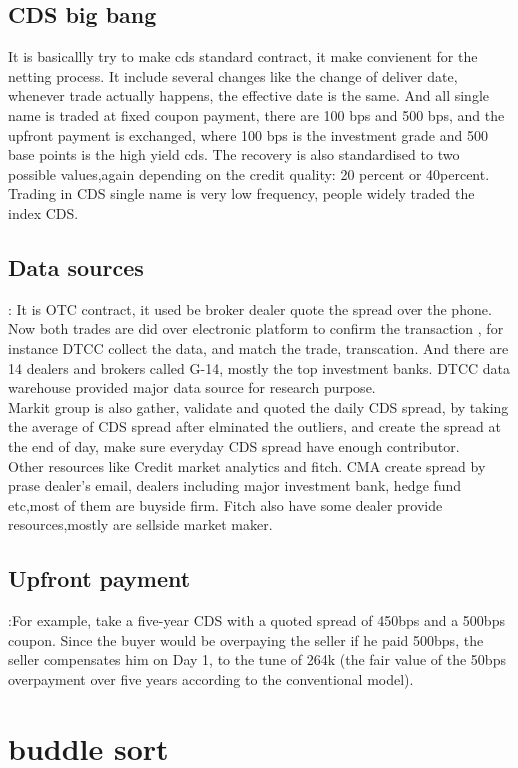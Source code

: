 \documentclass[a4paper,11pt]{article}
\begin{document}
\subsection{CDS big bang}
It is basicallly try to make cds standard contract, it make convienent for the netting process. It include several changes like the change of deliver date, whenever trade actually happens, the effective date is the same. And all single name is traded at fixed coupon payment, there are 100 bps and 500 bps, and the upfront payment is exchanged, where 100 bps is the investment grade and 500 base points is the high yield cds. The recovery is also standardised to two possible values,again depending on the credit quality: 20 percent  or 40percent.\\
Trading in CDS single name is very low frequency, people widely traded the index CDS.
\subsection{Data sources}: It is OTC contract, it used be broker dealer quote the spread over the phone. Now both trades are did over electronic platform to confirm the transaction , for instance DTCC collect the data, and match the trade, transcation. And there are 14 dealers and brokers called G-14, mostly the top investment banks. DTCC data warehouse provided major data source for research purpose.\\
Markit group is also gather, validate and quoted the daily CDS spread, by taking the average of CDS spread after elminated the outliers, and create the spread at the end of day, make sure everyday CDS spread have enough contributor.\\
Other resources like Credit market analytics and fitch. CMA create spread by prase dealer's email, dealers including major investment bank, hedge fund etc,most of them are buyside firm. Fitch also have some dealer provide resources,mostly are sellside market maker.
\subsection{Upfront payment}:For example, take a five-year CDS with a quoted spread of 450bps and a 500bps coupon. Since the buyer would be overpaying the seller if he paid 500bps, the seller compensates him on Day 1, to the tune of 264k (the fair value of the 50bps overpayment over five years according to the conventional model).





\section{buddle sort}
\end{document}
